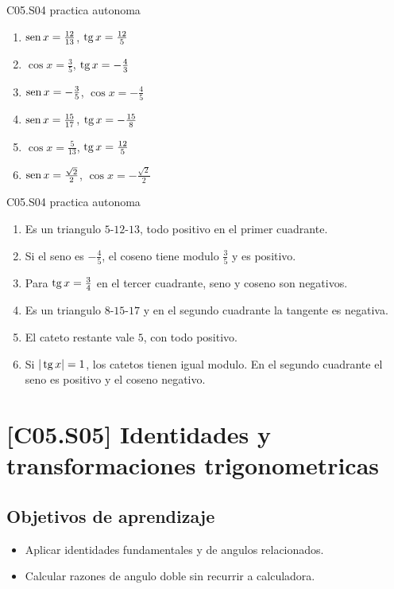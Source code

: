 \begin{shortanswer}{C05.S04 practica autonoma}
\begin{enumerate}[label=\textbf{PX-C05.S04-\arabic*:}, leftmargin=*]
  \item \(\operatorname{sen} x=\frac{12}{13}\), \(\operatorname{tg} x=\frac{12}{5}\)
  \item \(\cos x=\frac{3}{5}\), \(\operatorname{tg} x=-\frac{4}{3}\)
  \item \(\operatorname{sen} x=-\frac{3}{5}\), \(\cos x=-\frac{4}{5}\)
  \item \(\operatorname{sen} x=\frac{15}{17}\), \(\operatorname{tg} x=-\frac{15}{8}\)
  \item \(\cos x=\frac{5}{13}\), \(\operatorname{tg} x=\frac{12}{5}\)
  \item \(\operatorname{sen} x=\frac{\sqrt{2}}{2}\), \(\cos x=-\frac{\sqrt{2}}{2}\)
\end{enumerate}
\end{shortanswer}

\begin{fullsolution}{C05.S04 practica autonoma}
\begin{enumerate}[label=\textbf{PX-C05.S04-\arabic*:}, leftmargin=*]
  \item Es un triangulo \(5\)-\(12\)-\(13\), todo positivo en el primer cuadrante.
  \item Si el seno es \(-\frac{4}{5}\), el coseno tiene modulo \(\frac{3}{5}\) y es positivo.
  \item Para \(\operatorname{tg} x=\frac{3}{4}\) en el tercer cuadrante, seno y coseno son negativos.
  \item Es un triangulo \(8\)-\(15\)-\(17\) y en el segundo cuadrante la tangente es negativa.
  \item El cateto restante vale \(5\), con todo positivo.
  \item Si \(|\operatorname{tg} x|=1\), los catetos tienen igual modulo. En el segundo cuadrante el seno es
  positivo y el coseno negativo.
\end{enumerate}
\end{fullsolution}

\section{[C05.S05] Identidades y transformaciones trigonometricas}

\subsection*{Objetivos de aprendizaje}
\begin{itemize}
  \item Aplicar identidades fundamentales y de angulos relacionados.
  \item Calcular razones de angulo doble sin recurrir a calculadora.
\end{itemize}

